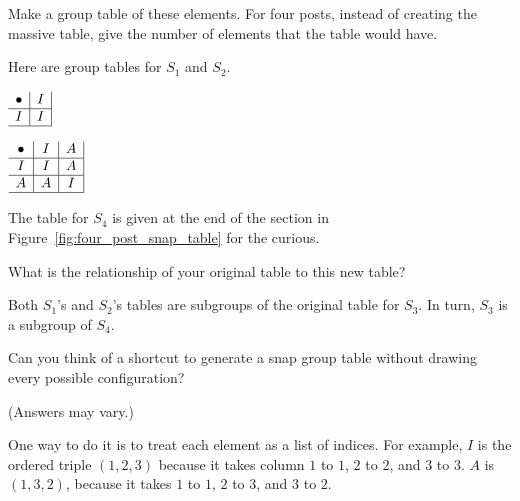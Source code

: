 \documentclass[../gatm_answers.tex]{subfiles}
\begin{document}
\begin{inner_problem}
	\item Make a group table of these elements. For four posts, instead of creating the massive table, give the number of elements that the table would have.
\end{inner_problem}

Here are group tables for $S_1$ and $S_2$.

\begin{minipage}{0.45\textwidth}
\centering
$\begin{array}{c|c|}
\bullet & I \\ \hline
I & I \\ \hline
\end{array}$
\end{minipage}\hfill
\begin{minipage}{0.45\textwidth}
\centering
$\begin{array}{c|c|c|}
\bullet & I & A \\ \hline
I & I & A \\ \hline
A & A & I \\ \hline
\end{array}$
\end{minipage}

The table for $S_4$ is given at the end of the section in Figure~\ref{fig:four_post_snap_table} for the curious.

\begin{inner_problem}
	\item What is the relationship of your original table to this new table?
\end{inner_problem}

Both $S_1$'s and $S_2$'s tables are subgroups of the original table for $S_3$. In turn, $S_3$ is a subgroup of $S_4$.

\begin{outer_problem}
	\item Can you think of a shortcut to generate a snap group table without drawing every possible configuration?
\end{outer_problem}

(Answers may vary.)

One way to do it is to treat each element as a list of indices. For example, $I$ is the ordered triple $(1,2,3)$ because it takes column $1$ to $1$, $2$ to $2$, and $3$ to $3$. $A$ is $(1,3,2)$, because it takes $1$ to $1$, $2$ to $3$, and $3$ to $2$.
\end{document}
